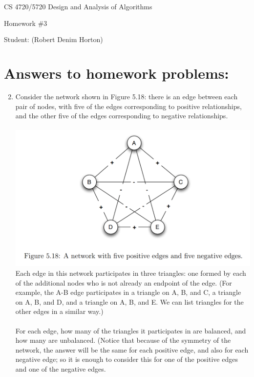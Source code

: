 \documentclass[11pt]{article}
\begin{document}
 

\rhead{\today}

\begin{center}\begin{Large}
CS 4720/5720 Design and Analysis of Algorithms

Homework \#3

Student: (Robert Denim Horton)
\end{Large}
\end{center}


\section*{Answers to homework problems:}

\begin{enumerate}
\setcounter{enumi}{1}
\item 
Consider the network shown in Figure 5.18: there is an edge between each pair of nodes, with five of the edges corresponding to positive relationships, and the other five of the edges corresponding to negative relationships.\\\\
\includegraphics[scale=1]{Figure_5_18}\\
Each edge in this network participates in three triangles: one formed by each of the additional nodes who is not already an endpoint of the edge. (For example, the A-B edge participates in a triangle on A, B, and C, a triangle on A, B, and D, and a triangle on A, B, and E. We can list triangles for the other edges in a similar way.)\\\\
For each edge, how many of the triangles it participates in are balanced, and how many are unbalanced. (Notice that because of the symmetry of the network, the answer will be the same for each positive edge, and also for each negative edge; so it is enough to consider this for one of the positive edges and one of the negative edges.\\



\end{enumerate}
\end{document}
